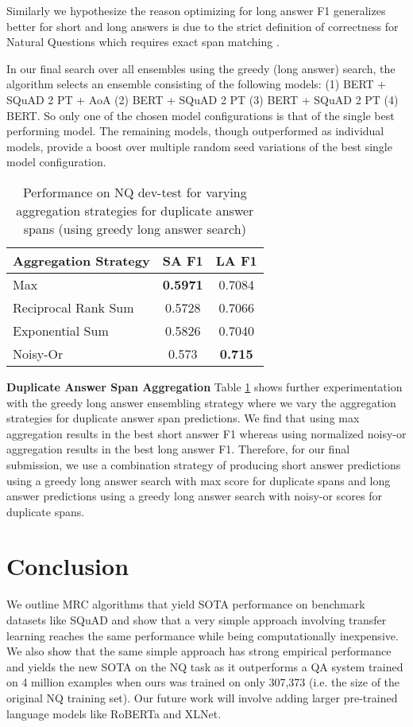 \documentclass[letterpaper]{article} \usepackage{aaai20}  \usepackage{times}  \usepackage{helvet} \usepackage{courier}  \usepackage[hyphens]{url}  \usepackage{graphicx} \urlstyle{rm} \def\UrlFont{\rm}  \usepackage{graphicx}  \frenchspacing  \setlength{\pdfpagewidth}{8.5in}  \setlength{\pdfpageheight}{11in}  \usepackage{amsmath}
\newcommand{\best}[1]{\textbf{#1}}
\begin{document}
Similarly we hypothesize the reason optimizing for long answer F1 generalizes better for short and long answers is due to the strict definition of correctness for Natural Questions which requires exact span matching \cite{Kwiatkowski2019NaturalQA}.  

In our final search over all ensembles using the greedy (long answer) search, the algorithm selects an ensemble consisting of the following models: (1) BERT + SQuAD 2 PT + AoA (2) BERT + SQuAD 2 PT (3) BERT + SQuAD 2 PT (4) BERT. So only one of the chosen model configurations is that of the single best performing model.  The remaining models, though outperformed as individual models, provide a boost over multiple random seed variations of the best single model configuration.

\begin{table}[]
\centering
\begin{tabular}{lcc}
\toprule
Aggregation Strategy  & SA F1 & LA F1  \\ \toprule
Max  & \best{0.5971} & 0.7084  \\ \midrule
Reciprocal Rank Sum & 0.5728 & 0.7066  \\ \midrule
Exponential Sum  & 0.5826 & 0.7040  \\ \midrule
Noisy-Or  & 0.573 & \best{0.715} \\ \bottomrule
\end{tabular}
\caption{Performance on NQ dev-test for varying aggregation strategies for duplicate answer spans (using greedy long answer search)}
\label{tab:exp:ens:norm-agg}
\end{table}

\textbf{Duplicate Answer Span Aggregation} Table \ref{tab:exp:ens:norm-agg} shows further experimentation with the greedy long answer ensembling strategy where we vary the aggregation strategies for duplicate answer span predictions. We find that using max aggregation results in the best short answer F1 whereas using normalized noisy-or aggregation results in the best long answer F1.  Therefore, for our final submission, we use a combination strategy of producing short answer predictions using a greedy long answer search with max score for duplicate spans and long answer predictions using a greedy long answer search with noisy-or scores for duplicate spans. \section{Conclusion}
\label{sec:conclusion}
We outline MRC algorithms that yield SOTA performance on benchmark datasets like SQuAD and show that a very simple approach involving transfer learning reaches the same performance while being computationally inexpensive. We also show that the same simple approach has strong empirical performance and yields the new SOTA on the NQ task as it outperforms a QA system trained on 4 million examples when ours was trained on only 307,373 (i.e. the size of the original NQ training set). Our future work will involve adding larger pre-trained language models like RoBERTa and XLNet. 


\end{document}

